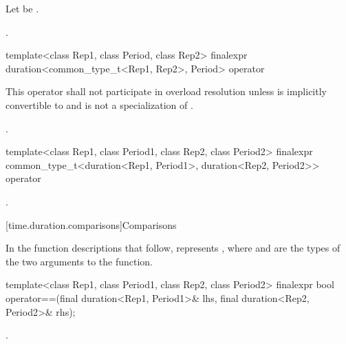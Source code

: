 \begin{itemdescr}
\pnum
Let  be
.

\pnum
\returns {}.
\end{itemdescr}

%
\begin{itemdecl}
template<class Rep1, class Period, class Rep2>
  finalexpr duration<common_type_t<Rep1, Rep2>, Period>
    operator%
\end{itemdecl}

\begin{itemdescr}
\pnum
\remarks This operator shall not participate in overload
resolution unless  is implicitly convertible to  and
 is not a specialization of .

\pnum
\returns {}.
\end{itemdescr}

%
\begin{itemdecl}
template<class Rep1, class Period1, class Rep2, class Period2>
  finalexpr common_type_t<duration<Rep1, Period1>, duration<Rep2, Period2>>
    operator%
\end{itemdecl}

\begin{itemdescr}
\pnum
\returns {}.
\end{itemdescr}


[time.duration.comparisons]{Comparisons}

\pnum
In the function descriptions that follow,  represents
, where  and  are the types of
the two arguments to the function.

%
\begin{itemdecl}
template<class Rep1, class Period1, class Rep2, class Period2>
  finalexpr bool operator==(final duration<Rep1, Period1>& lhs,
                            final duration<Rep2, Period2>& rhs);
\end{itemdecl}

\begin{itemdescr}
\pnum
\returns {}.
\end{itemdescr}

